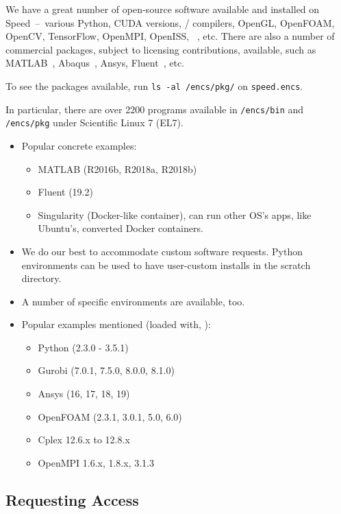 \documentclass{easychair}
\begin{document}
We have a great number of open-source software available and installed
on Speed~--~various Python, CUDA versions, {\cpp}/{\java} compilers, OpenGL,
OpenFOAM, OpenCV, TensorFlow, OpenMPI, OpenISS, {\marf}~\cite{marf}, etc.
There are also a number of commercial packages, subject to licensing
contributions, available, such as MATLAB~\cite{matlab,scholarpedia-matlab}, Abaqus~\cite{abaqus}, 
Ansys, Fluent~\cite{fluent}, etc. 

To see the packages available, run \texttt{ls -al /encs/pkg/} on \texttt{speed.encs}.

In particular, there are over 2200 programs available in
\texttt{/encs/bin} and \texttt{/encs/pkg} under Scientific Linux 7 (EL7).

\begin{itemize}
	\item 
Popular concrete examples:
\begin{itemize}
	\item 
MATLAB (R2016b, R2018a, R2018b)
	\item 
Fluent (19.2)
	\item 
Singularity (Docker-like container), can run other OS's apps, like Ubuntu's, converted Docker containers.
\end{itemize}
	\item 
We do our best to accommodate custom software requests.
Python environments can be used to have user-custom installs
in the scratch directory.
	\item 
A number of specific environments are available, too.
	\item 
Popular examples mentioned (loaded with, ):
\begin{itemize}
	\item 
Python (2.3.0 - 3.5.1)
	\item 
Gurobi (7.0.1, 7.5.0, 8.0.0, 8.1.0)
	\item 
Ansys (16, 17, 18, 19)
	\item 
OpenFOAM (2.3.1, 3.0.1, 5.0, 6.0)
	\item 
Cplex 12.6.x to 12.8.x
	\item 
OpenMPI 1.6.x, 1.8.x, 3.1.3
\end{itemize}
\end{itemize}

\subsection{Requesting Access}
\end{document}
